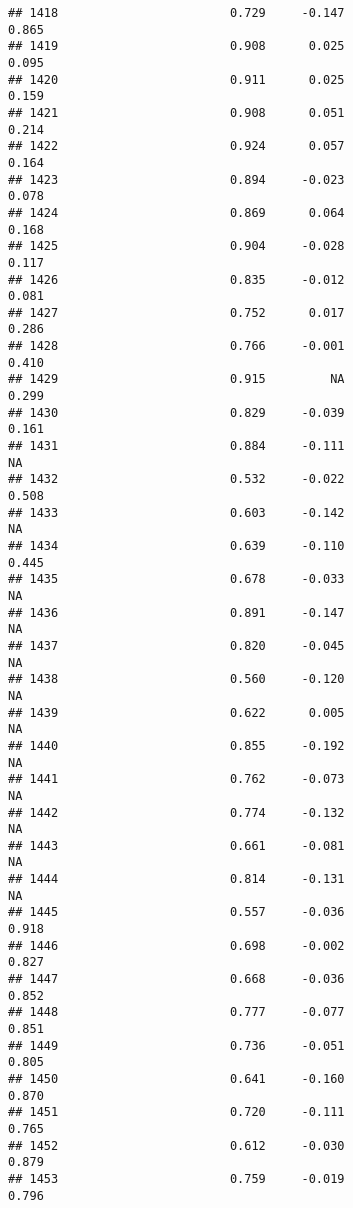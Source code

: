 \documentclass[
]{article}
\begin{document}
\begin{verbatim}
## 1418                        0.729     -0.147                     0.865
## 1419                        0.908      0.025                     0.095
## 1420                        0.911      0.025                     0.159
## 1421                        0.908      0.051                     0.214
## 1422                        0.924      0.057                     0.164
## 1423                        0.894     -0.023                     0.078
## 1424                        0.869      0.064                     0.168
## 1425                        0.904     -0.028                     0.117
## 1426                        0.835     -0.012                     0.081
## 1427                        0.752      0.017                     0.286
## 1428                        0.766     -0.001                     0.410
## 1429                        0.915         NA                     0.299
## 1430                        0.829     -0.039                     0.161
## 1431                        0.884     -0.111                        NA
## 1432                        0.532     -0.022                     0.508
## 1433                        0.603     -0.142                        NA
## 1434                        0.639     -0.110                     0.445
## 1435                        0.678     -0.033                        NA
## 1436                        0.891     -0.147                        NA
## 1437                        0.820     -0.045                        NA
## 1438                        0.560     -0.120                        NA
## 1439                        0.622      0.005                        NA
## 1440                        0.855     -0.192                        NA
## 1441                        0.762     -0.073                        NA
## 1442                        0.774     -0.132                        NA
## 1443                        0.661     -0.081                        NA
## 1444                        0.814     -0.131                        NA
## 1445                        0.557     -0.036                     0.918
## 1446                        0.698     -0.002                     0.827
## 1447                        0.668     -0.036                     0.852
## 1448                        0.777     -0.077                     0.851
## 1449                        0.736     -0.051                     0.805
## 1450                        0.641     -0.160                     0.870
## 1451                        0.720     -0.111                     0.765
## 1452                        0.612     -0.030                     0.879
## 1453                        0.759     -0.019                     0.796

\end{verbatim}
\end{document}
